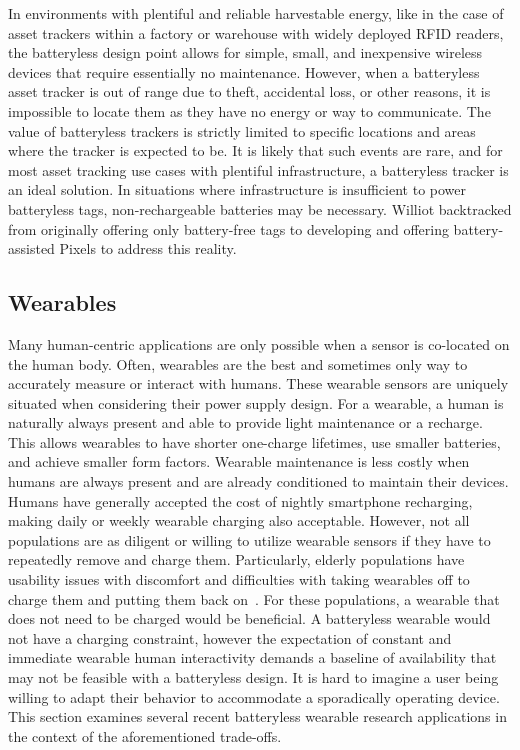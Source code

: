 In environments with plentiful and reliable harvestable energy, like in the case of asset trackers within a factory or warehouse with widely deployed RFID readers, the batteryless design point allows for simple, small, and inexpensive wireless devices that require essentially no maintenance.
However, when a batteryless asset tracker is out of range due to theft, accidental loss, or other reasons, it is impossible to locate them as they have no energy or way to communicate.
The value of batteryless trackers is strictly limited to specific locations and areas where the tracker is expected to be.
It is likely that such events are rare, and for most asset tracking use cases with plentiful infrastructure, a batteryless tracker is an ideal solution.
In situations where infrastructure is insufficient to power batteryless tags, non-rechargeable batteries may be necessary. Williot backtracked from originally offering only battery-free tags to developing and offering battery-assisted Pixels to address this reality.

\subsection{Wearables}
Many human-centric applications are only possible when a sensor is co-located on the human body.
Often, wearables are the
best and sometimes only way to accurately measure or interact with humans.
These wearable sensors are uniquely situated when considering their power supply design.
For a wearable, a human is naturally always present and able to provide light maintenance or a recharge.
This allows wearables to have shorter one-charge lifetimes, use smaller batteries, and achieve smaller form factors.
Wearable maintenance is less costly when humans are always present and are already conditioned to maintain their devices.
Humans have generally accepted the cost of nightly smartphone recharging, making daily or weekly wearable charging also acceptable.
However, not all populations are as diligent or willing to utilize wearable sensors if they have to repeatedly remove and charge them. 
Particularly, elderly populations have usability issues with discomfort and difficulties with taking wearables off to charge them and putting them back on~\cite{valk2018designing}.
For these populations, a wearable that does not need to be charged would be beneficial. 
A batteryless wearable would not have a charging constraint, however
the expectation of constant and immediate wearable human interactivity demands a baseline of availability that may not be feasible with a batteryless design.
It is hard to imagine a user being willing to adapt their behavior to accommodate a sporadically operating device.
This section examines several recent batteryless wearable research applications in the context of the aforementioned trade-offs.

